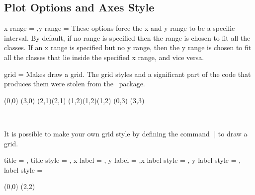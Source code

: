 \begin{sseqdata}[|| name = ex1, cohomological Serre grading]
\subsection{Plot Options and Axes Style}
\begin{keylist}{x range = ,y range = }
These options force the x and y range to be a specific interval. By default, if no range is specified then the range is chosen to fit all the classes. If an x range is specified but no y range, then the y range is chosen to fit all the classes that lie inside the specified x range, and vice versa.
\end{keylist}

\begin{key}{grid = }
Makes \sseqpages\space draw a grid. The grid styles and a significant part of the code that produces them were stolen from the \sseqpkg\ package.
\begin{codeexample}[vbox]
\begin{sseqdata}[ name = grid example, scale = 0.8 ]
\class(0,0)
\class(3,0)
\class(2,1)\class(2,1)
\class(1,2)\class(1,2)\class(1,2)
\class(0,3)
\class(3,3)
\end{sseqdata}
\hbox{
\printpage[ name = grid example, grid = chess ]
\qquad
\printpage[ name = grid example, grid = crossword ]
\qquad
\printpage[ name = grid example, grid = dots ]
}
\vskip20pt
\hbox{
\printpage[ name = grid example, grid = go ]
\qquad
\printpage[ name = grid example, grid = none ]
}
\end{codeexample}
It is possible to make your own grid style by defining the command |\sseq@grid@yourgridname| to draw a grid.
\end{key}

\begin{keylist}{title = , title style = , x label = , y label = ,x label style = , y label style = , label style = }
\begin{codeexample}[width = 6cm]
\begin{sseqpage}[ title = { An example }, yscale = 0.5,
    x label = { x axis label },
    y label = { y axis label },
    label style = { blue, font = \small },
    x label style = { yshift = 5pt },
    ]
\class(0,0)
\class(2,2)
\end{sseqpage}
\end{codeexample}
\end{keylist}



\end{sseqdata}
